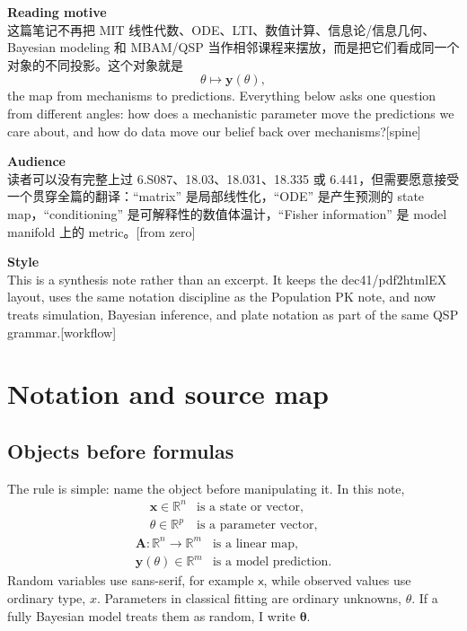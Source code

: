 \documentclass[a4paper]{article}
\newcommand{\R}{\mathbb{R}}
\newcommand{\mat}[1]{\mathbf{#1}}
\newcommand{\vect}[1]{\mathbf{#1}}
\newcommand{\rv}[1]{\mathsf{#1}}
\newcommand{\param}{\theta}
\newcommand{\rtheta}{\boldsymbol{\theta}}
\begin{document}
\maketitle
{\small
  \noindent\textbf{Reading motive}\\
  这篇笔记不再把 MIT 线性代数、ODE、LTI、数值计算、信息论/信息几何、Bayesian modeling 和 MBAM/QSP 当作相邻课程来摆放，而是把它们看成同一个对象的不同投影。这个对象就是
  \[
    \param\longmapsto\vect{y}(\param),
  \]
  the map from mechanisms to predictions.  Everything below asks one question from different angles: how does a mechanistic parameter move the predictions we care about, and how do data move our belief back over mechanisms?\hspace*{\fill}[spine]

  \vspace{5pt}
  \noindent\textbf{Audience}\\
  读者可以没有完整上过 6.S087、18.03、18.031、18.335 或 6.441，但需要愿意接受一个贯穿全篇的翻译：``matrix'' 是局部线性化，``ODE'' 是产生预测的 state map，``conditioning'' 是可解释性的数值体温计，``Fisher information'' 是 model manifold 上的 metric。\hspace*{\fill}[from zero]

  \vspace{5pt}
  \noindent\textbf{Style}\\
  This is a synthesis note rather than an excerpt.  It keeps the dec41/pdf2htmlEX layout, uses the same notation discipline as the Population PK note, and now treats simulation, Bayesian inference, and plate notation as part of the same QSP grammar.\hspace*{\fill}[workflow]
}

\tableofcontents

\section{Notation and source map}

\subsection{Objects before formulas}

The rule is simple: name the object before manipulating it.  In this note,
\[
  \begin{array}{ll}
    \vect{x}\in\R^n & \text{is a state or vector,}\\
    \param\in\R^p & \text{is a parameter vector,}
  \end{array}
\]
\[
  \begin{array}{ll}
    \mat{A}:\R^n\to\R^m & \text{is a linear map,}\\
    \vect{y}(\param)\in\R^m & \text{is a model prediction.}
  \end{array}
\]
Random variables use sans-serif, for example \(\rv{x}\), while observed values use ordinary type, \(x\).  Parameters in classical fitting are ordinary unknowns, \(\param\).  If a fully Bayesian model treats them as random, I write \(\rtheta\).
\end{document}
